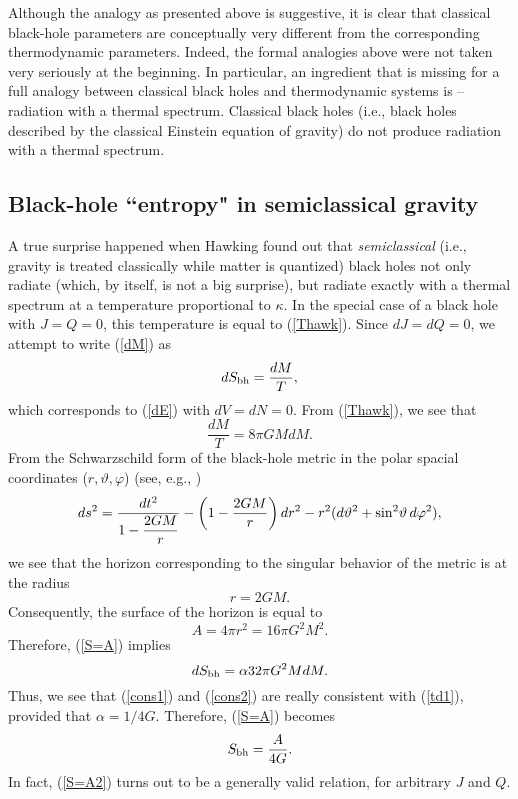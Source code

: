 \documentclass[12pt]{article}
\begin{document}
Although the analogy as presented above is suggestive, it is clear 
that classical black-hole parameters are conceptually very different 
from the corresponding thermodynamic parameters.    
Indeed, the formal analogies above 
were not taken very seriously at the beginning. In particular, 
an ingredient that is missing for a full analogy between classical 
black holes and thermodynamic systems is -- radiation 
with a thermal spectrum. Classical black holes
(i.e., black holes described by the classical Einstein
equation of gravity)
do not produce radiation with a thermal spectrum.

\subsection{Black-hole ``entropy" in semiclassical gravity}

A true surprise happened when Hawking found out \cite{hawk} that
{\em semiclassical} (i.e., gravity is treated classically 
while matter is quantized) black holes  
not only radiate (which, by itself, 
is not a big surprise), but radiate exactly with a thermal spectrum 
at a temperature proportional to $\kappa$. In the special case of a 
black hole with $J=Q=0$, this temperature is equal to
(\ref{Thawk}). 
Since $dJ=dQ=0$, we attempt to write (\ref{dM}) as
 \begin{equation}\label{td1}
dS_{\rm bh}=\frac{dM}{T} ,
\end{equation}
which corresponds to (\ref{dE}) with $dV=dN=0$.
From (\ref{Thawk}), we see that
\begin{equation}\label{cons1}
\frac{dM}{T}=8\pi GMdM .
\end{equation}
From the Schwarzschild form of the black-hole metric in the 
polar spacial coordinates ($r,\vartheta,\varphi$) (see, e.g.,
\cite{carrol})
\begin{equation}
ds^2=\frac{dt^2}{1-\displaystyle\frac{2GM}{r}}
-\left( 1-\frac{2GM}{r} \right) dr^2 -r^2 (d\vartheta^2 +
{\rm sin}^2\vartheta \, d\varphi^2 ) ,
\end{equation}
we see that the horizon corresponding to the singular behavior 
of the metric is at the radius
\begin{equation}
r=2GM .
\end{equation}
Consequently, the surface of the horizon is equal to
\begin{equation}\label{bhpom}
A=4\pi r^2=16\pi G^2 M^2. 
\end{equation}
Therefore, (\ref{S=A}) implies
\begin{equation}\label{cons2}
dS_{\rm bh}=\alpha 32\pi G^2 MdM.
\end{equation}
Thus, we see that (\ref{cons1}) and (\ref{cons2}) are really 
consistent with (\ref{td1}), provided that $\alpha=1/4G$.
Therefore, (\ref{S=A}) becomes   
\begin{equation}\label{S=A2}
S_{\rm bh}=\frac{A}{4G} .
\end{equation}
In fact, (\ref{S=A2}) turns out to be a generally valid relation, 
for arbitrary $J$ and $Q$. 
\end{document}
